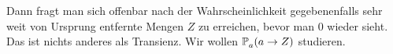 Dann fragt man sich offenbar nach der Wahrscheinlichkeit gegebenenfalls sehr weit von Ursprung entfernte Mengen $Z$ zu erreichen, bevor man $0$ wieder sieht. Das ist nichts anderes als Transienz. Wir wollen $\propE{a \to Z}[][a]$ studieren.


\newpage



